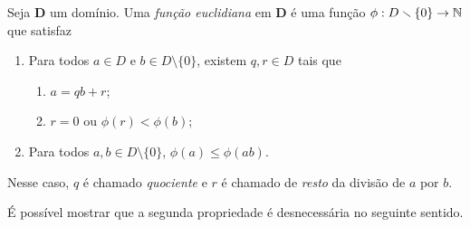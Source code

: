 \begin{definition}
Seja $\bm D$ um domínio. Uma \emph{função euclidiana} em $\bm D$ é uma função $\phi: D \smallsetminus \{0\} \to \mathbb{N}$ que satisfaz
	\begin{enumerate}
	\item Para todos $a \in D$ e $b \in D \setminus \{0\}$, existem $q,r \in D$ tais que
		\begin{enumerate}
		\item $a=qb+r$;
		\item $r=0 \text{\ \ ou\ \ } \phi(r)<\phi(b)$;
		\end{enumerate}
	\item Para todos $a,b \in D \setminus \{0\}$, $\phi(a) \leq \phi(ab)$.
	\end{enumerate}
	Nesse caso, $q$ é chamado \emph{quociente} e $r$ é chamado de \emph{resto} da divisão de $a$ por $b$.
\end{definition}

É possível mostrar que a segunda propriedade é desnecessária no seguinte sentido.


